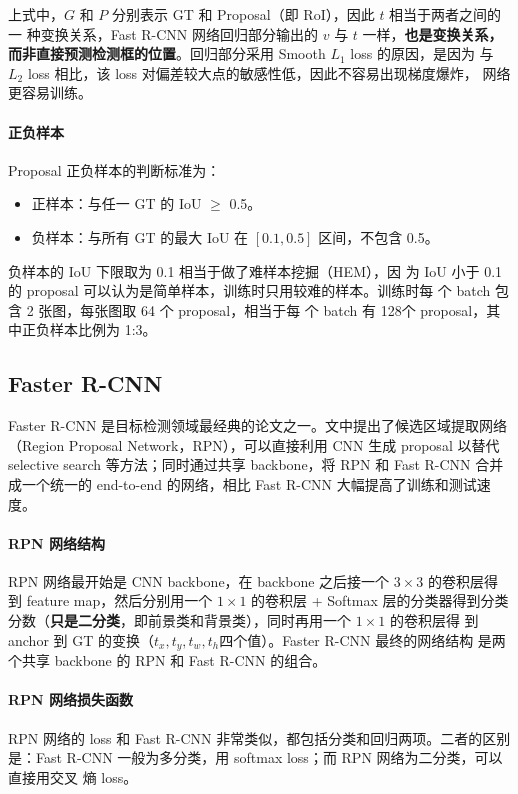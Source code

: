 上式中，$G$ 和 $P$ 分别表示 GT 和 Proposal（即 RoI），因此 $t$ 相当于两者之间的一
种变换关系，Fast R-CNN 网络回归部分输出的 $v$ 与 $t$ 一样，\textbf{也是变换关系，
  而非直接预测检测框的位置}。回归部分采用 Smooth $L_1$ loss 的原因，是因为
与 $L_2$ loss 相比，该 loss 对偏差较大点的敏感性低，因此不容易出现梯度爆炸，
网络更容易训练。

\paragraph{正负样本}
Proposal 正负样本的判断标准为：

\begin{itemize}
  \item 正样本：与任一 GT 的 IoU $ \geq $ 0.5。
  \item 负样本：与所有 GT 的最大 IoU 在 $ [0.1, 0.5] $ 区间，不包含 0.5。
\end{itemize}

负样本的 IoU 下限取为 0.1 相当于做了难样本挖掘（HEM），因
为 IoU 小于 0.1 的 proposal 可以认为是简单样本，训练时只用较难的样本。训练时每
个 batch 包含 2 张图，每张图取 64 个 proposal，相当于每
个 batch 有 128个 proposal，其中正负样本比例为 1:3。

\subsection{Faster R-CNN}\label{subsec:Faster-R-CNN}

Faster R-CNN 是目标检测领域最经典的论文之一。文中提出了候选区域提取网络（Region
Proposal Network，RPN），可以直接利用 CNN 生成 proposal 以替代 selective search
等方法；同时通过共享 backbone，将 RPN 和 Fast R-CNN 合并成一个统一的 end-to-end
的网络，相比 Fast R-CNN 大幅提高了训练和测试速度。

\paragraph{RPN 网络结构}
RPN 网络最开始是 CNN backbone，在 backbone 之后接一个 $3 \times 3$ 的卷积层得
到 feature map，然后分别用一个 $1 \times 1$ 的卷积层 + Softmax 层的分类器得到分类
分数（\textbf{只是二分类}，即前景类和背景类），同时再用一个 $1 \times 1$ 的卷积层得
到 anchor 到 GT 的变换（$t_x, t_y, t_w, t_h$四个值）。Faster R-CNN 最终的网络结构
是两个共享 backbone 的 RPN 和 Fast R-CNN 的组合。

\paragraph{RPN 网络损失函数}
RPN 网络的 loss 和 Fast R-CNN 非常类似，都包括分类和回归两项。二者的区别
是：Fast R-CNN 一般为多分类，用 softmax loss；而 RPN 网络为二分类，可以直接用交叉
熵 loss。

